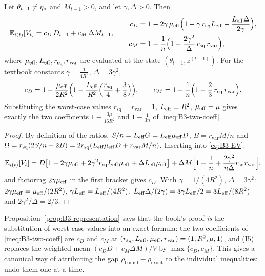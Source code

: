 \begin{proposition}\label{prop:B3-representation}
Let $\theta_{t-1}\ne\eta_\ast$ and $M_{t-1}>0$, and let $\gamma,\Delta>0$. Then
\begin{equation}\label{eq:B3-representation}
\mathbb{E}_{i(t)}[V_t]=c_D\,D_{t-1}+c_M\,\Delta M_{t-1},\qquad
\begin{aligned}
c_D&=1-2\gamma\,\mu_{\mathrm{eff}}\Big(1-\gamma\,r_{\mathrm{sq}}L_{\mathrm{eff}}-\frac{L_{\mathrm{eff}}\Delta}{2\gamma}\Big),\\
c_M&=1-\frac1n\Big(1-\frac{2\gamma^2}{\Delta}\,r_{\mathrm{sq}}\,r_{\mathrm{var}}\Big),
\end{aligned}
\end{equation}
where $\mu_{\mathrm{eff}},L_{\mathrm{eff}},r_{\mathrm{sq}},r_{\mathrm{var}}$ are evaluated at the state $(\theta_{t-1},z^{(t-1)})$. For the textbook constants $\gamma=\frac1{4R^2}$, $\Delta=3\gamma^2$,
\begin{equation}\label{eq:B3-representation-book}
c_D=1-\frac{\mu_{\mathrm{eff}}}{2R^2}\Big(1-\frac{L_{\mathrm{eff}}}{R^2}\Big(\frac{r_{\mathrm{sq}}}4+\frac38\Big)\Big),\qquad
c_M=1-\frac1n\Big(1-\frac23\,r_{\mathrm{sq}}\,r_{\mathrm{var}}\Big).
\end{equation}
Substituting the worst-case values $r_{\mathrm{sq}}=r_{\mathrm{var}}=1$, $L_{\mathrm{eff}}=R^2$, $\mu_{\mathrm{eff}}=\mu$ gives exactly the two coefficients $1-\frac{3\mu}{16R^2}$ and $1-\frac1{3n}$ of \eqref{ineq:B3-two-coeff}.
\end{proposition}
\begin{proof}
By definition of the ratios, $S/n=L_{\mathrm{eff}} G=L_{\mathrm{eff}}\mu_{\mathrm{eff}} D$, $B=r_{\mathrm{var}}M/n$ and $\Omega=r_{\mathrm{sq}}(2S/n+2B)=2r_{\mathrm{sq}}(L_{\mathrm{eff}}\mu_{\mathrm{eff}} D+r_{\mathrm{var}}M/n)$. Inserting into \eqref{eq:B3-EV}:
\[
\mathbb{E}_{i(t)}[V_t]=D\big[1-2\gamma\mu_{\mathrm{eff}}+2\gamma^2r_{\mathrm{sq}}L_{\mathrm{eff}}\mu_{\mathrm{eff}}+\Delta L_{\mathrm{eff}}\mu_{\mathrm{eff}}\big]+\Delta M\Big[1-\frac1n+\frac{2\gamma^2}{n\Delta}r_{\mathrm{sq}}r_{\mathrm{var}}\Big],
\]
and factoring $2\gamma\mu_{\mathrm{eff}}$ in the first bracket gives $c_D$. With $\gamma=1/(4R^2)$, $\Delta=3\gamma^2$: $2\gamma\mu_{\mathrm{eff}}=\mu_{\mathrm{eff}}/(2R^2)$, $\gamma L_{\mathrm{eff}}=L_{\mathrm{eff}}/(4R^2)$, $L_{\mathrm{eff}}\Delta/(2\gamma)=3\gamma L_{\mathrm{eff}}/2=3L_{\mathrm{eff}}/(8R^2)$ and $2\gamma^2/\Delta=2/3$.
\end{proof}

Proposition~\ref{prop:B3-representation} says that the book's proof \emph{is} the substitution of worst-case values into an exact formula: the two coefficients of \eqref{ineq:B3-two-coeff} are $c_D$ and $c_M$ at $(r_{\mathrm{sq}},L_{\mathrm{eff}},\mu_{\mathrm{eff}},r_{\mathrm{var}})=(1,R^2,\mu,1)$, and (I5) replaces the weighted mean $(c_DD+c_M\Delta M)/V$ by $\max\{c_D,c_M\}$. This gives a canonical way of attributing the gap $\rho_{\mathrm{bound}}-\rho_{\mathrm{exact}}$ to the individual inequalities: undo them one at a time.

